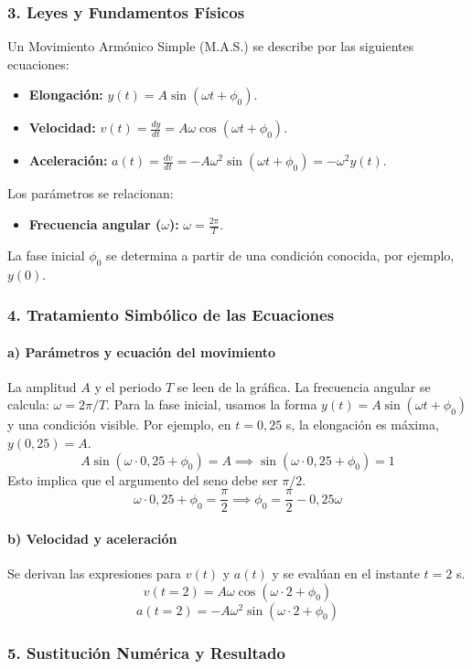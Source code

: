 \subsubsection*{3. Leyes y Fundamentos Físicos}
Un Movimiento Armónico Simple (M.A.S.) se describe por las siguientes ecuaciones:
\begin{itemize}
    \item \textbf{Elongación:} $y(t) = A\sin(\omega t + \phi_0)$.
    \item \textbf{Velocidad:} $v(t) = \frac{dy}{dt} = A\omega\cos(\omega t + \phi_0)$.
    \item \textbf{Aceleración:} $a(t) = \frac{dv}{dt} = -A\omega^2\sin(\omega t + \phi_0) = -\omega^2 y(t)$.
\end{itemize}
Los parámetros se relacionan:
\begin{itemize}
    \item \textbf{Frecuencia angular ($\omega$):} $\omega = \frac{2\pi}{T}$.
\end{itemize}
La fase inicial $\phi_0$ se determina a partir de una condición conocida, por ejemplo, $y(0)$.

\subsubsection*{4. Tratamiento Simbólico de las Ecuaciones}
\paragraph{a) Parámetros y ecuación del movimiento}
La amplitud $A$ y el periodo $T$ se leen de la gráfica.
La frecuencia angular se calcula: $\omega = 2\pi/T$.
Para la fase inicial, usamos la forma $y(t) = A\sin(\omega t + \phi_0)$ y una condición visible. Por ejemplo, en $t=0,25$ s, la elongación es máxima, $y(0,25)=A$.
$$ A\sin(\omega \cdot 0,25 + \phi_0) = A \implies \sin(\omega \cdot 0,25 + \phi_0) = 1 $$
Esto implica que el argumento del seno debe ser $\pi/2$.
$$ \omega \cdot 0,25 + \phi_0 = \frac{\pi}{2} \implies \phi_0 = \frac{\pi}{2} - 0,25\omega $$

\paragraph{b) Velocidad y aceleración}
Se derivan las expresiones para $v(t)$ y $a(t)$ y se evalúan en el instante $t=2$ s.
$$ v(t=2) = A\omega\cos(\omega \cdot 2 + \phi_0) $$
$$ a(t=2) = -A\omega^2\sin(\omega \cdot 2 + \phi_0) $$

\subsubsection*{5. Sustitución Numérica y Resultado}
